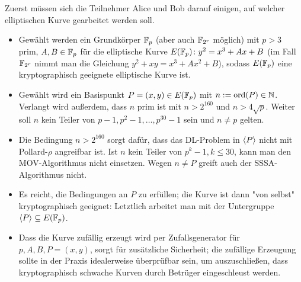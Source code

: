 \begin{anw}
	Zuerst müssen sich die Teilnehmer Alice und Bob darauf einigen, auf welcher elliptischen Kurve gearbeitet werden soll.
	\begin{itemize}
		\item Gewählt werden ein Grundkörper $\mathbb{F}_p$ (aber auch $\mathbb{F}_{2^r}$ möglich) mit $p > 3$ prim, $A,B \in \mathbb{F}_p$ für die elliptische Kurve $E(\mathbb{F}_p)\colon y^2 = x^3 + Ax + B$ (im Fall $\mathbb{F}_{2^r}$ nimmt man die Gleichung $y^2 + xy = x^3 + Ax^2 + B$), sodass $E(\mathbb{F}_p)$ eine kryptographisch geeignete elliptische Kurve ist.
		\item Gewählt wird ein Basispunkt $P = (x,y) \in E(\mathbb{F}_p)$ mit $n := \operatorname{ord}(P) \in \mathbb{N}$. Verlangt wird außerdem, dass $n$ prim ist mit $n > 2^{160}$ und $n > 4\sqrt{p}$.
		Weiter soll $n$ kein Teiler von $p-1, p^2-1, \dots, p^{30}-1$ sein und $n \neq p$ gelten.
	\end{itemize}
\end{anw}

\begin{bem}
	\begin{itemize}
		\item Die Bedingung $n > 2^{160}$ sorgt dafür, dass das DL-Problem in $\langle P\rangle$ nicht mit Pollard-$\rho$ angreifbar ist.
		Ist $n$ kein Teiler von $p^k-1, k \leq 30$, kann man den MOV-Algorithmus nicht einsetzen.
		Wegen $n \neq P$ greift auch der SSSA-Algorithmus nicht.
		\item Es reicht, die Bedingungen an $P$ zu erfüllen; die Kurve ist dann "von selbst" kryptographisch geeignet: Letztlich arbeitet man mit der Untergruppe $\langle P\rangle \subseteq E(\mathbb{F}_p)$.
		\item Dass die Kurve zufällig erzeugt wird per Zufallsgenerator für $p,A,B, P=(x,y)$, sorgt für zusätzliche Sicherheit; die zufällige Erzeugung sollte in der Praxis idealerweise überprüfbar sein, um auszuschließen, dass kryptographisch schwache Kurven durch Betrüger eingeschleust werden.
	\end{itemize}
\end{bem}

